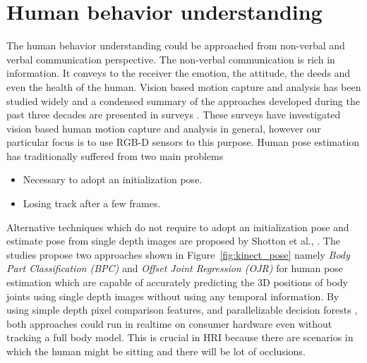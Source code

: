 \section{Human behavior understanding} %
The human behavior understanding could be approached from non-verbal and verbal communication perspective. The non-verbal communication is rich in information. It conveys to the receiver the emotion, the attitude, the deeds and even the health of the human. Vision based motion capture and analysis has been studied widely and a condensed summary of the approaches developed during the past three decades are presented in surveys \cite{Moeslund2001231}\cite{Moeslund200690}\cite{Poppe20074}. These surveys have investigated vision based human motion capture and analysis in general, however our particular focus is to use RGB-D sensors to this purpose. Human pose estimation has traditionally suffered from two main problems
\begin{itemize}[leftmargin={1cm},topsep={0pt},itemsep={0pt},partopsep={0pt},parsep={0pt}] 
\item Necessary to adopt an initialization pose.
\item Losing track after a few frames.
\end{itemize}
Alternative techniques which do not require to adopt an initialization pose and estimate pose from single depth images are proposed by Shotton et al., \cite{shotton2013real} \cite{shotton2013efficient}. The studies propose two approaches shown in Figure~\ref{fig:kinect_pose} namely \emph{Body Part Classification (BPC)} and \emph{Offset Joint Regression (OJR)} for human pose estimation which are capable of accurately predicting the 3D positions of body joints using single depth images without using any temporal information. By using simple depth pixel comparison features, and parallelizable decision forests \cite{breiman2001random}, both approaches could run in realtime on consumer hardware even without tracking a full body model. This is crucial in HRI because there are scenarios in which the human might be sitting and there will be lot of occlusions. 
